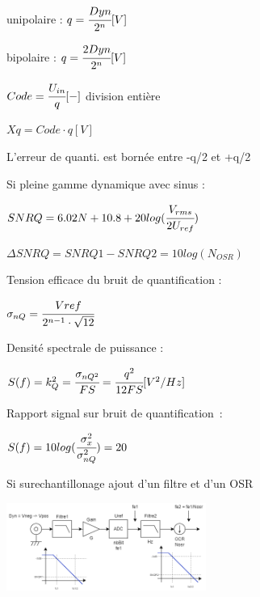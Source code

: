 
unipolaire : $q = \cfrac{Dyn}{2^n} [V]$

bipolaire : $q = \cfrac{2Dyn}{2^n} [V]$

$Code = \cfrac{U_{in}}{q} [-]$ division entière

$Xq = Code \cdot q [V]$

L’erreur de quanti. est bornée entre -q/2 et +q/2

\hformbar



Si pleine gamme dynamique avec sinus : 

$SNRQ = 6.02N + 10.8 + 20log(\cfrac{V_{rms}}{2U_{ref}}) $

$\Delta SNRQ = SNRQ1 - SNRQ2 =10log(N_{OSR}) $


Tension efficace du bruit de quantification : 

$\sigma_{nQ} = \cfrac{Vref}{2^{n-1}\cdot\sqrt{12}}$

Densité spectrale de puissance :

$S(f) = k_Q^2 = \cfrac{\sigma_{nQ^2}}{FS} = \cfrac{q^2}{12FS} [V^2 / Hz] $

Rapport signal sur bruit de quantification :

$S(f) = 10log(\cfrac{\sigma_{x}^2}{\sigma_{nQ}^2})  = 20$


Si surechantillonage  ajout d'un filtre et d'un OSR
\vspace{5mm}

\includegraphics[width = 0.49\textwidth,center]{img/Chaine-aquis.drawio.png}
